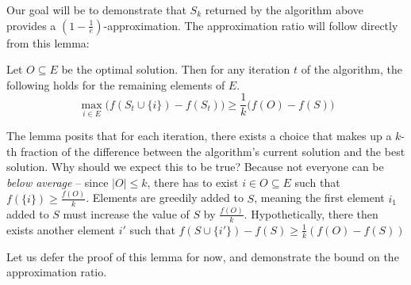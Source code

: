 \documentclass{article}
\begin{document}
\noindent{}
\vspace{1em}

Our goal will be to demonstrate that $S_k$ returned by the algorithm above provides a $(1 - \frac{1}{e})$-approximation. The approximation ratio will follow directly from this lemma:

\begin{lemma}\label{lem:monotone-sub-mod}
Let $O \subseteq E$ be the optimal solution. Then for any iteration $t$ of the algorithm, the following holds for the remaining elements of $E$.
\begin{equation*}
\max_{i \in E} \Big( f(S_t \cup \{ i \}) - f(S_t) \Big) \geq \frac{1}{k} \big( f(O) - f(S) \big)
\end{equation*}
\end{lemma}

The lemma posits that for each iteration, there exists a choice that makes up a $k$-th fraction of the difference between the algorithm's current solution and the best solution. Why should we expect this to be true? Because not everyone can be \emph{below average} -- since $\lvert O \rvert \leq k$, there has to exist $i \in O \subseteq E$ such that $f(\{ i \}) \geq \frac{f(O)}{k}$. Elements are greedily added to $S$, meaning the first element $i_1$ added to $S$ must increase the value of $S$ by $\frac{f(O)}{k}$. Hypothetically, there then exists another element $i'$ such that $f(S \cup \{ i' \}) - f(S) \geq \frac{1}{k} (f(O) - f(S))$

Let us defer the proof of this lemma for now, and demonstrate the bound on the approximation ratio.
\end{document}
